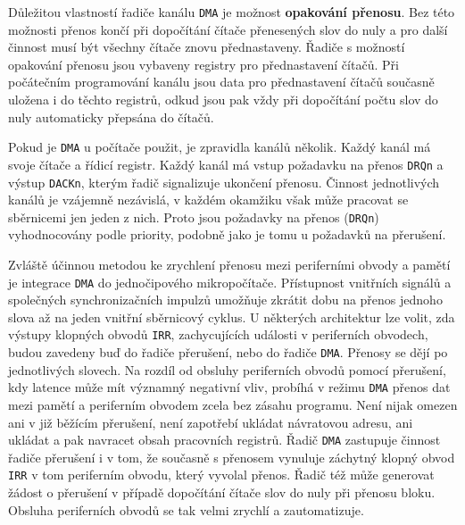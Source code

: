       Důležitou vlastností řadiče kanálu \texttt{DMA} je možnost \textbf{opakování přenosu}. Bez 
      této možnosti přenos končí při dopočítání čítače přenesených slov do nuly a pro další činnost 
      musí být všechny čítače znovu přednastaveny. Řadiče s možností opakování přenosu jsou 
      vybaveny registry pro přednastavení čítačů. Při počátečním programování kanálu jsou data pro 
      přednastavení čítačů současně uložena i do těchto registrů, odkud jsou pak vždy při 
      dopočítání počtu slov do nuly automaticky přepsána do čítačů.
      
      Pokud je \texttt{DMA} u počítače použit, je zpravidla kanálů několik. Každý kanál má svoje 
      čítače a řídicí registr. Každý kanál má vstup požadavku na přenos \texttt{DRQn} a výstup 
      \texttt{DACKn}, kterým řadič signalizuje ukončení přenosu. Činnost jednotlivých kanálů je 
      vzájemně nezávislá, v každém okamžiku však může pracovat se sběrnicemi jen jeden z nich. 
      Proto jsou požadavky na přenos (\texttt{DRQn}) vyhodnocovány podle priority, podobně jako je 
      tomu u požadavků na přerušení.
      
      Zvláště účinnou metodou ke zrychlení přenosu mezi periferními obvody a pamětí je integrace 
      \texttt{DMA} do jednočipového mikropočítače. Přístupnost vnitřních signálů a společných 
      synchronizačních impulzů umožňuje zkrátit dobu na přenos jednoho slova až na jeden vnitřní 
      sběrnicový cyklus. U některých architektur lze volit, zda výstupy klopných obvodů 
      \texttt{IRR}, zachycujících události v periferních obvodech, budou zavedeny buď do řadiče 
      přerušení, nebo do řadiče \texttt{DMA}. Přenosy se dějí po jednotlivých slovech. Na rozdíl od 
      obsluhy periferních obvodů pomocí přerušení, kdy latence může mít významný negativní vliv, 
      probíhá v režimu \texttt{DMA} přenos dat mezi pamětí a periferním obvodem  zcela bez zásahu 
      programu. Není nijak omezen ani v již běžícím přerušení, není zapotřebí ukládat       
      návratovou adresu, ani ukládat a pak navracet obsah pracovních registrů. Řadič \texttt{DMA} 
      zastupuje činnost řadiče přerušení i v tom, že současně s přenosem vynuluje záchytný klopný 
      obvod \texttt{IRR} v tom periferním obvodu, který vyvolal přenos. Řadič též může generovat 
      žádost o přerušení v případě  dopočítání čítače slov do nuly při přenosu bloku. Obsluha 
      periferních obvodů se tak velmi zrychlí a zautomatizuje.
      
